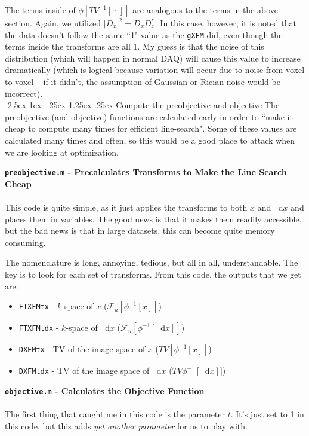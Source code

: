 \documentclass[11 pt]{article}
\makeatletter
\renewcommand\subparagraph{\@startsection{subparagraph}{5}{\z@}%
            {-2.5ex\@plus -1ex \@minus -.25ex}%
            {1.25ex \@plus .25ex}%
            {\normalfont\normalsize\bfseries}}
\newcommand*\diff{\mathop{}\!\mathrm{d}}
\newcommand{\bo}{\noindent\textbf}
\makeatother
\begin{document}
            The terms inside of $\phi[TV^{-1}[\dotsm]]$ are analogous to the terms in the above section. Again, we utilized $|D_x|^2 = D_x D_x^*$. In this case, however, it is noted that the data doesn't follow the same ``1" value as the \texttt{gXFM} did, even though the terms inside the transforms are all 1. My guess is that the noise of this distribution (which will happen in normal DAQ) will cause this value to increase dramatically (which is logical because variation will occur due to noise from voxel to voxel -- if it didn't, the assumption of Gaussian or Rician noise would be incorrect).\\

        \subparagraph{Compute the preobjective and objective}
          The preobjective (and objective) functions are calculated early in order to ``make it cheap to compute many times for efficient line-search". Some of these values are calculated many times and often, so this would be a good place to attack when we are looking at optimization.
          
          
          \bo{\texttt{preobjective.m} - Precalculates Transforms to Make the Line Search Cheap}
            \hfill\\\\
            This code is quite simple, as it just applies the transforms to both $x$ and $\diff x$ and places them in variables. The good news is that it makes them readily accessible, but the bad news is that in large datasets, this can become quite memory consuming. 

            The nomenclature is long, annoying, tedious, but all in all, understandable. The key is to look for each set of transforms. From this code, the outputs that we get are:
            \begin{itemize}
              \item \texttt{FTXFMtx} - $k$-space of $x$ ($\mathcal{F}_u[\phi^{-1}[x]]$) 
              \item \texttt{FTXFMtdx} - $k$-space of $\diff x$ ($\mathcal{F}_u[\phi^{-1}[\diff x]]$)
              \item \texttt{DXFMtx} - TV of the image space of $x$ ($TV[\phi^{-1}[x]]$) 
              \item \texttt{DXFMtdx} - TV of the image space of $\diff x$  ($TV\phi^{-1}[\diff x]]$)
              \end{itemize}

          \bo{\texttt{objective.m} - Calculates the Objective Function}
            \hfill\\\\
            The first thing that caught me in this code is the parameter $t$. It's just set to 1 in this code, but this adds \emph{yet another parameter} for us to play with. 
\end{document}
